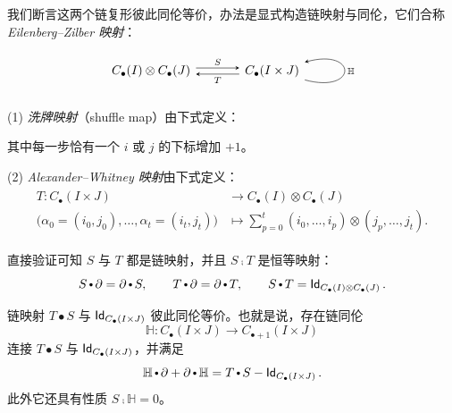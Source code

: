 我们断言这两个链复形彼此同伦等价，办法是显式构造链映射与同伦，它们合称
\emph{Eilenberg--Zilber 映射}：
\begin{equation}\label{eqn:EZMaps}
\begin{tikzcd}[arrow style=tikz,>=stealth,row sep=2.5em,column sep=3.5em]
C_{\bullet}(I)\otimes C_{\bullet}(J)
  \arrow[r, shift left, "S"]
&
C_{\bullet}(I\times J)
  \arrow[l, shift left, "T"]
  \arrow[loop right, <-, "\mathbb{H}"]
\end{tikzcd}
\end{equation}

\begin{defn}\label{defn:EZMaps}
(1) \emph{洗牌映射}（shuffle map）由下式定义：
\begin{center}
\end{center}
其中每一步恰有一个 $i$ 或 $j$ 的下标增加 $+1$。

\noindent
(2) \emph{Alexander--Whitney 映射}由下式定义：
\begin{align*}
\begin{split}
T:
C_{\bullet}(I\times J)
&\rightarrow
C_{\bullet}(I)\otimes C_{\bullet}(J)
\\[0mm]
\big(\alpha_0=(i_0,j_0),\dots,\alpha_t=(i_t,j_t)\big)
&\mapsto
\sum_{p=0}^t
(i_0,\dots,i_p)\otimes(j_p,\dots,j_t).
\end{split}
\end{align*}
\end{defn}

直接验证可知 $S$ 与 $T$ 都是链映射，并且 $S\comp T$ 是恒等映射：
$$
S\comp \partial=\partial \comp S,
\qquad
T\comp \partial=\partial \comp T,
\qquad
S\comp T=\id_{C_{\bullet}(I)\otimes C_{\bullet}(J)}.
$$

\begin{prop}\label{prp:chain-homotopy-TS}
链映射 $T\bullet S$ 与 $\operatorname{\mathsf{Id}}_{C_{\bullet}(I\times J)}$ 彼此同伦等价。也就是说，存在链同伦
$$
\mathbb{H}:
C_{\bullet}(I\times J)
\rightarrow
C_{\bullet+1}(I\times J)
$$
连接 $T\bullet S$ 与 $\operatorname{\mathsf{Id}}_{C_{\bullet}(I\times J)}$，并满足
$$
\mathbb{H}\comp \partial+\partial\comp \mathbb{H}
=
T\comp S-
\id_{C_{\bullet}(I\times J)}.
$$
此外它还具有性质 $S\comp \mathbb{H}=0$。
\end{prop}

